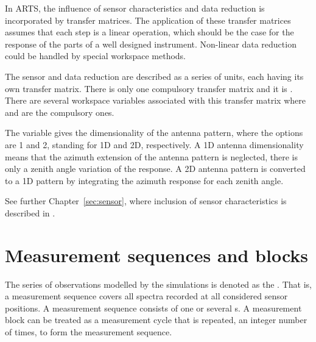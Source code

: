 In ARTS, the influence of sensor characteristics and data reduction is
incorporated by transfer matrices. The
application of these transfer matrices assumes that each step is a
linear operation, which should be the case for the response of the
parts of a well designed instrument. Non-linear data reduction could
be handled by special workspace methods.

The sensor and data reduction are described as a series of units, each having
its own transfer matrix. There is only one compulsory transfer matrix and it is
. There are several workspace variables associated
with this transfer matrix where  and
 are the compulsory ones.

The variable  gives the dimensionality of the antenna
pattern, where the options are 1 and 2,
standing for 1D and 2D, respectively. A 1D antenna dimensionality means that
the azimuth extension of the antenna pattern is neglected, there is only a
zenith angle variation of the response. A 2D antenna pattern is converted to a
1D pattern by integrating the azimuth response for each zenith angle. 

See further Chapter~\ref{sec:sensor}, where inclusion of sensor characteristics
is described in .



\section{Measurement sequences and blocks}
\label{sec:fm_defs:seqsandblocks}

The series of observations modelled by the simulations is denoted as the
. That is, a measurement sequence covers all
spectra recorded at all considered sensor positions. A measurement sequence
consists of one or several s. A measurement block
can be treated as a measurement cycle that is repeated, an integer number of
times, to form the measurement sequence.

